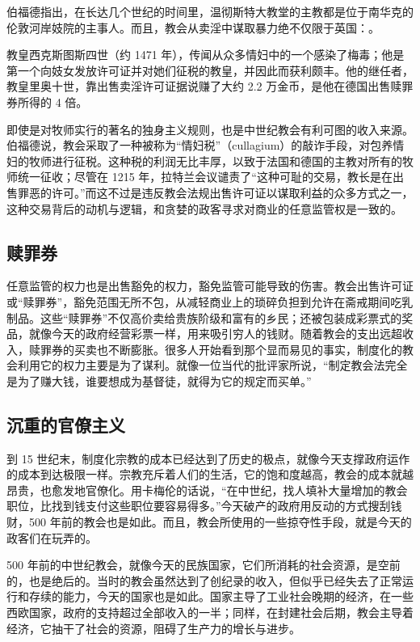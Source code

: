 伯福德指出，在长达几个世纪的时间里，温彻斯特大教堂的主教都是位于南华克的伦敦河岸妓院的主事人。而且，教会从卖淫中谋取暴力绝不仅限于英国：。

\begin{tcolorbox}
教皇西克斯图斯四世（约 1471 年），传闻从众多情妇中的一个感染了梅毒；他是第一个向妓女发放许可证并对她们征税的教皇，并因此而获利颇丰。他的继任者，教皇里奥十世，靠出售卖淫许可证据说赚了大约 2.2 万金币，是他在德国出售赎罪券所得的 4 倍。
\end{tcolorbox}


即使是对牧师实行的著名的独身主义规则，也是中世纪教会有利可图的收入来源。伯福德说，教会采取了一种被称为“情妇税”（cullagium）的敲诈手段，对包养情妇的牧师进行征税。这种税的利润无比丰厚，以致于法国和德国的主教对所有的牧师统一征收；尽管在 1215 年，拉特兰会议谴责了“这种可耻的交易，教长是在出售罪恶的许可。”而这不过是违反教会法规出售许可证以谋取利益的众多方式之一，这种交易背后的动机与逻辑，和贪婪的政客寻求对商业的任意监管权是一致的。

\subsection{赎罪券}
任意监管的权力也是出售豁免的权力，豁免监管可能导致的伤害。教会出售许可证或“赎罪券”，豁免范围无所不包，从减轻商业上的琐碎负担到允许在斋戒期间吃乳制品。这些“赎罪券”不仅高价卖给贵族阶级和富有的乡民；还被包装成彩票式的奖品，就像今天的政府经营彩票一样，用来吸引穷人的钱财。随着教会的支出远超收入，赎罪券的买卖也不断膨胀。很多人开始看到那个显而易见的事实，制度化的教会利用它的权力主要是为了谋利。就像一位当代的批评家所说，“制定教会法完全是为了赚大钱，谁要想成为基督徒，就得为它的规定而买单。”
\subsection{沉重的官僚主义}
到 15 世纪末，制度化宗教的成本已经达到了历史的极点，就像今天支撑政府运作的成本到达极限一样。宗教充斥着人们的生活，它的饱和度越高，教会的成本就越昂贵，也愈发地官僚化。用卡梅伦的话说，“在中世纪，找人填补大量增加的教会职位，比找到钱支付这些职位要容易得多。”今天破产的政府用反动的方式搜刮钱财，500 年前的教会也是如此。而且，教会所使用的一些掠夺性手段，就是今天的政客们在玩弄的。

500 年前的中世纪教会，就像今天的民族国家，它们所消耗的社会资源，是空前的，也是绝后的。当时的教会虽然达到了创纪录的收入，但似乎已经失去了正常运行和存续的能力，今天的国家也是如此。国家主导了工业社会晚期的经济，在一些西欧国家，政府的支持超过全部收入的一半；同样，在封建社会后期，教会主导着经济，它抽干了社会的资源，阻碍了生产力的增长与进步。

